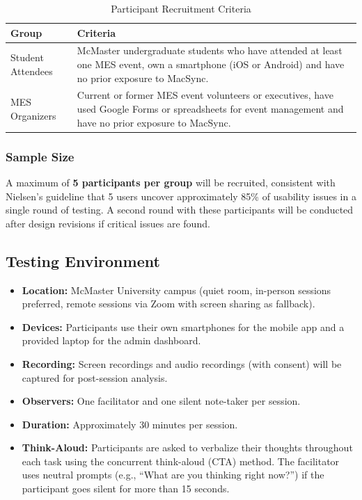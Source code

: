 \documentclass[12pt, titlepage]{article}
\begin{document}
\begin{table}[H]
\centering
\caption{Participant Recruitment Criteria}
\begin{tabularx}{\textwidth}{p{3.5cm}X}
\toprule
\textbf{Group} & \textbf{Criteria} \\
\midrule
Student Attendees & McMaster undergraduate students who have attended at least one MES event, own a smartphone (iOS or Android) and have no prior exposure to MacSync. \\
\midrule
MES Organizers & Current or former MES event volunteers or executives, have used Google Forms or spreadsheets for event management and have no prior exposure to MacSync. \\
\bottomrule
\end{tabularx}
\end{table}


\subsubsection{Sample Size}


A maximum of \textbf{5 participants per group} will be recruited, consistent with Nielsen's guideline that 5 users uncover approximately 85\% of usability issues in a single round of testing. A second round with these participants will be conducted after design revisions if critical issues are found.


\subsection{Testing Environment}


\begin{itemize}
    \item \textbf{Location:} McMaster University campus (quiet room, in-person sessions preferred, remote sessions via Zoom with screen sharing as fallback).
    \item \textbf{Devices:} Participants use their own smartphones for the mobile app and a provided laptop for the admin dashboard.
    \item \textbf{Recording:} Screen recordings and audio recordings (with consent) will be captured for post-session analysis.
    \item \textbf{Observers:} One facilitator and one silent note-taker per session.
    \item \textbf{Duration:} Approximately 30 minutes per session.
    \item \textbf{Think-Aloud:} Participants are asked to verbalize their thoughts throughout each task using the concurrent think-aloud (CTA) method. The facilitator uses neutral prompts (e.g., ``What are you thinking right now?'') if the participant goes silent for more than 15 seconds.
\end{itemize}
\end{document}
